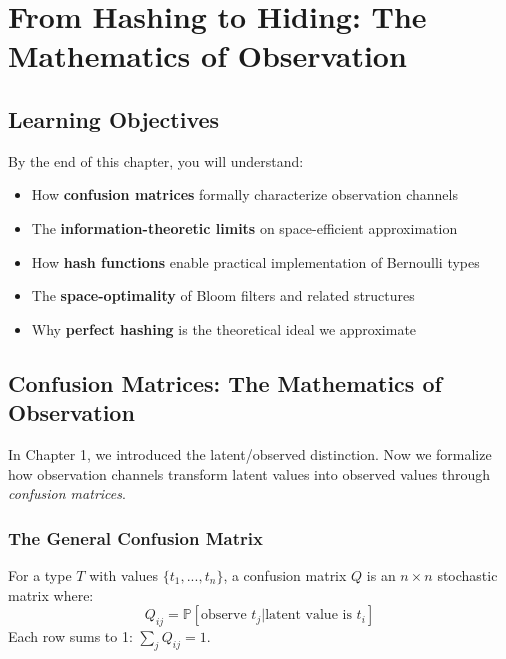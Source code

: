 \chapter{From Hashing to Hiding: The Mathematics of Observation}
\label{ch:hashing-to-hiding}

\section{Learning Objectives}

By the end of this chapter, you will understand:
\begin{itemize}
\item How \textbf{confusion matrices} formally characterize observation channels
\item The \textbf{information-theoretic limits} on space-efficient approximation
\item How \textbf{hash functions} enable practical implementation of Bernoulli types
\item The \textbf{space-optimality} of Bloom filters and related structures
\item Why \textbf{perfect hashing} is the theoretical ideal we approximate
\end{itemize}

\section{Confusion Matrices: The Mathematics of Observation}

In Chapter 1, we introduced the latent/observed distinction. Now we formalize how observation channels transform latent values into observed values through \textit{confusion matrices}.

\subsection{The General Confusion Matrix}

\begin{definition}
For a type $T$ with values $\{t_1, ..., t_n\}$, a confusion matrix $Q$ is an $n \times n$ stochastic matrix where:
\begin{equation}
Q_{ij} = \mathbb{P}[\text{observe } t_j | \text{latent value is } t_i]
\end{equation}
Each row sums to 1: $\sum_j Q_{ij} = 1$.
\end{definition}

